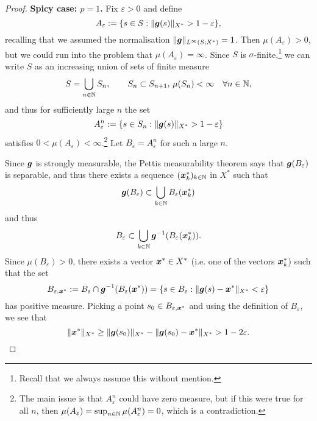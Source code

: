 \begin{proof}
  \textbf{Spicy case: $p=1$.}
  Fix $\varepsilon > 0$ and define
  \begin{equation}
    A_{\varepsilon} := \{s \in S : \|\bm{g}(s)\|_{X^*} > 1-\varepsilon\},
  \end{equation}
  recalling that we assumed the normalisation $\|\bm{g}\|_{L^\infty(S;X^{*})} = 1$.
  Then $\mu(A_\varepsilon) > 0$, but we could run into the problem that $\mu(A_\varepsilon) = \infty$.
  Since $S$ is $\sigma$-finite,\footnote{Recall that we always assume this without mention.} we can write $S$ as an increasing union of sets of finite measure
  \begin{equation*}
    S = \bigcup_{n \in \mathbb{N}} S_n, \qquad S_n \subset S_{n+1}, \, \mu(S_n) < \infty \quad \forall n \in \mathbb{N},
  \end{equation*}
  and thus for sufficiently large $n$ the set
  \begin{equation*}
    A_{\varepsilon}^{n} := \{s \in S_n : \|\bm{g}(s)\|_{X^*} > 1 - \varepsilon\}
  \end{equation*}
  satisfies $0 < \mu(A_\varepsilon) < \infty$.\footnote{The main issue is that $A_{\varepsilon}^{n}$ could have zero measure, but if this were true for all $n$, then $\mu(A_{\varepsilon}) = \sup_{n \in \mathbb{N}} \mu(A_{\varepsilon}^n) = 0$, which is a contradiction.}
  Let $B_\varepsilon = A_{\varepsilon}^{n}$ for such a large $n$.

  Since $\bm{g}$ is strongly measurable, the Pettis measurability theorem says that $\bm{g}(B_\varepsilon)$ is separable, and thus there exists a sequence $(\bm{x}^*_{k})_{k \in \mathbb{N}}$ in $X^*$ such that
  \begin{equation*}
    \bm{g}(B_\varepsilon) \subset \bigcup_{k \in \mathbb{N}} B_{\varepsilon}(\bm{x}^{*}_{k})
  \end{equation*}
  and thus
  \begin{equation*}
    B_{\varepsilon} \subset \bigcup_{k \in \mathbb{N}} \bm{g}^{-1}(B_{\varepsilon}(\bm{x}^{*}_{k})).
  \end{equation*}
  Since $\mu(B_{\varepsilon}) > 0$, there exists a vector $\bm{x}^* \in X^*$ (i.e. one of the vectors $\bm{x}_k^{*}$) such that the set
  \begin{equation*}
     B_{\varepsilon, \bm{x}^*} := B_\varepsilon \cap \bm{g}^{-1}(B_{\varepsilon}(\bm{x}^{*})) = \{s \in B_\varepsilon : \|\bm{g}(s) - \bm{x}^{*}\|_{X^*} < \varepsilon\}
  \end{equation*}
  has positive measure.
  Picking a point $s_0 \in B_{\varepsilon, \bm{x}^*}$ and using the definition of $B_{\varepsilon}$, we see that
  \begin{equation*}
    \|\bm{x}^*\|_{X^*} \geq \|\bm{g}(s_0)\|_{X^*} - \|\bm{g}(s_0) - \bm{x}^*\|_{X^*} > 1 - 2\varepsilon.
  \end{equation*}


\end{proof}
